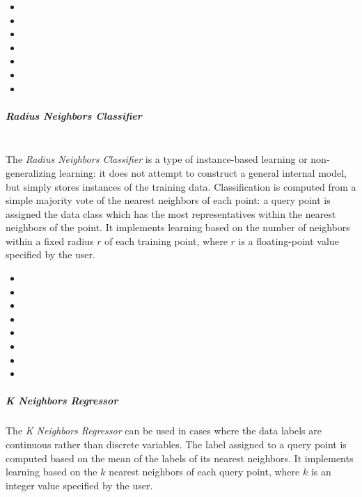 \begin{itemize}
  \item {}
  \item {}
  \item {}
  \item {}
  \item {}
  \item {}
  \item {}
\end{itemize}
\subparagraph{Radius Neighbors Classifier}
\mbox{}
\\The \textit{Radius Neighbors Classifier} is a type of instance-based learning
or non-generalizing learning: it does not attempt to construct a general
internal model, but simply stores instances of the training data.
%
Classification is computed from a simple majority vote of the nearest neighbors
of each point: a query point is assigned the data class which has the most
representatives within the nearest neighbors of the point.
%
It implements learning based on the number of neighbors within a fixed radius 
$r$ of each training point, where $r$ is a floating-point value specified by the
user.

\begin{itemize}
  \item {}
  \item {}
  \item {}
  \item {}
  \item {}
  \item {}
  \item {}
  \item {}
\end{itemize}

\subparagraph{K Neighbors Regressor}
\mbox{}

The \textit{K Neighbors Regressor} can be used in cases where the data labels
are continuous rather than discrete variables.
%
The label assigned to a query point is computed based on the mean of the labels
of its nearest neighbors.
%
It implements learning based on the $k$ nearest neighbors of each query point,
where $k$ is an integer value specified by the user.

